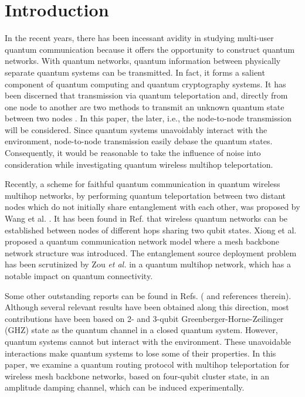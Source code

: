 \documentclass[aps,pra,twocolumn,showpacs,superscriptaddress,groupedaddress]{revtex4}
\begin{document}
\section{Introduction}
In the recent years, there has been incessant avidity in studying multi-user quantum communication because it offers the opportunity to construct quantum networks. With quantum networks, quantum information between physically separate quantum systems can be transmitted. In fact, it forms a salient component of quantum computing and quantum cryptography systems. It has been discerned that transmission via quantum teleportation and, directly from one node to another are two methods to transmit an unknown quantum state between two nodes \cite{MA1}. In this paper, the later, i.e.,  the node-to-node transmission will be considered. Since quantum systems unavoidably interact with the environment, node-to-node transmission easily debase the quantum states.  Consequently, it would be reasonable to take the influence of noise into consideration while investigating quantum wireless multihop teleportation.

Recently, a scheme for faithful quantum communication in quantum wireless multihop networks, by performing quantum teleportation between two distant nodes which do not initially share entanglement with each other, was proposed by Wang et al. \cite{MA2}. It has been found in Ref. \cite{RE1} that wireless quantum networks can be established between nodes of different hops sharing two qubit states. Xiong et al. \cite{MA3} proposed a quantum communication network model where a mesh backbone network structure was introduced. The entanglement source deployment problem has been scrutinized by Zou {\it et al.} \cite{RE2} in a quantum multihop network, which has a  notable impact on quantum connectivity.

Some other outstanding reports can be found in Refs. (\cite{MA4,RE3,RE4,RE5} and references therein). Although several relevant results have been obtained along this direction, most contributions have been based on 2- and 3-qubit Greenberger-Horne-Zeilinger (GHZ) state as the quantum channel in a closed quantum system. However, quantum systems cannot but interact with the environment. These unavoidable interactions make quantum systems to lose some of their properties. In this paper, we examine a quantum routing protocol with multihop teleportation for wireless mesh backbone networks, based on four-qubit cluster state, in an amplitude damping channel, which can be induced experimentally.
\end{document}
